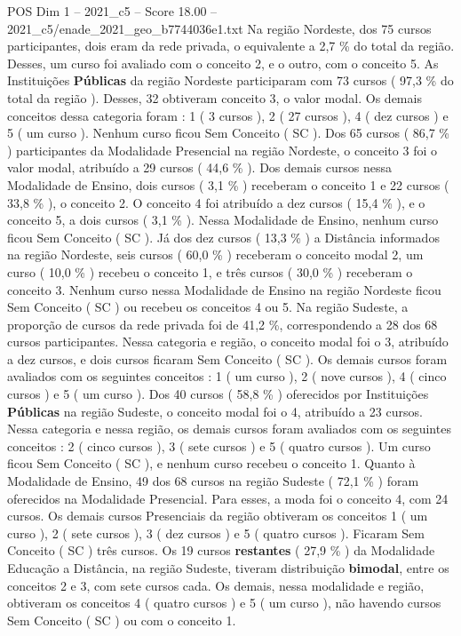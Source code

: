 \begin{textsample}{POS Dim 1 – 2021\_c5 – Score 18.00 – 2021\_c5/enade\_2021\_geo\_b7744036e1.txt}
Na região Nordeste, dos 75 cursos participantes, dois eram da rede privada, o equivalente a 2,7 \% do total da região.
Desses, um curso foi avaliado com o conceito 2, e o outro, com o conceito 5.
As Instituições \textbf{Públicas} da região Nordeste participaram com 73 cursos ( 97,3 \% do total da região ).
Desses, 32 obtiveram conceito 3, o valor modal.
Os demais conceitos dessa categoria foram : 1 ( 3 cursos ), 2 ( 27 cursos ), 4 ( dez cursos ) e 5 ( um curso ).
Nenhum curso ficou Sem Conceito ( SC ).
Dos 65 cursos ( 86,7 \% ) participantes da Modalidade Presencial na região Nordeste, o conceito 3 foi o valor modal, atribuído a 29 cursos ( 44,6 \% ).
Dos demais cursos nessa Modalidade de Ensino, dois cursos ( 3,1 \% ) receberam o conceito 1 e 22 cursos ( 33,8 \% ), o conceito 2.
O conceito 4 foi atribuído a dez cursos ( 15,4 \% ), e o conceito 5, a dois cursos ( 3,1 \% ).
Nessa Modalidade de Ensino, nenhum curso ficou Sem Conceito ( SC ).
Já dos dez cursos ( 13,3 \% ) a Distância informados na região Nordeste, seis cursos ( 60,0 \% ) receberam o conceito modal 2, um curso ( 10,0 \% ) recebeu o conceito 1, e três cursos ( 30,0 \% ) receberam o conceito 3.
Nenhum curso nessa Modalidade de Ensino na região Nordeste ficou Sem Conceito ( SC ) ou recebeu os conceitos 4 ou 5.
Na região Sudeste, a proporção de cursos da rede privada foi de 41,2 \%, correspondendo a 28 dos 68 cursos participantes.
Nessa categoria e região, o conceito modal foi o 3, atribuído a dez cursos, e dois cursos ficaram Sem Conceito ( SC ).
Os demais cursos foram avaliados com os seguintes conceitos : 1 ( um curso ), 2 ( nove cursos ), 4 ( cinco cursos ) e 5 ( um curso ).
Dos 40 cursos ( 58,8 \% ) oferecidos por Instituições \textbf{Públicas} na região Sudeste, o conceito modal foi o 4, atribuído a 23 cursos.
Nessa categoria e nessa região, os demais cursos foram avaliados com os seguintes conceitos : 2 ( cinco cursos ), 3 ( sete cursos ) e 5 ( quatro cursos ).
Um curso ficou Sem Conceito ( SC ), e nenhum curso recebeu o conceito 1.
Quanto à Modalidade de Ensino, 49 dos 68 cursos na região Sudeste ( 72,1 \% ) foram oferecidos na Modalidade Presencial.
Para esses, a moda foi o conceito 4, com 24 cursos.
Os demais cursos Presenciais da região obtiveram os conceitos 1 ( um curso ), 2 ( sete cursos ), 3 ( dez cursos ) e 5 ( quatro cursos ).
Ficaram Sem Conceito ( SC ) três cursos.
Os 19 cursos \textbf{restantes} ( 27,9 \% ) da Modalidade Educação a Distância, na região Sudeste, tiveram distribuição \textbf{bimodal}, entre os conceitos 2 e 3, com sete cursos cada.
Os demais, nessa modalidade e região, obtiveram os conceitos 4 ( quatro cursos ) e 5 ( um curso ), não havendo cursos Sem Conceito ( SC ) ou com o conceito 1.

\end{textsample}
